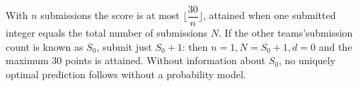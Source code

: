 With $n$ submissions the score is at most $\lfloor\dfrac{30}{n}\rfloor$, attained when one submitted integer equals the total number of submissions $N$. If the other teams'submission count is known as $S_0$, submit just $S_0+1$: then $n=1,N=S_0+1,d=0$ and the maximum 30 points is attained. Without information about $S_0$, no uniquely optimal prediction follows without a probability model.
